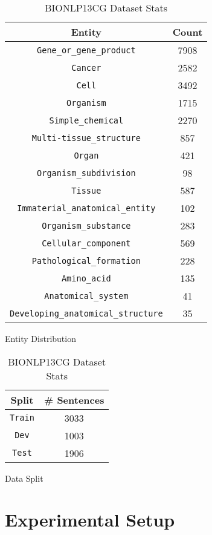 \begin{table}[h!]
\begin{subtable}[t]{.48\linewidth}
\centering
\begin{tabular}{|c|c|}\hline
	\textbf{Entity} & \textbf{Count}\\\hline
	\texttt{Gene\_or\_gene\_product} & 7908\\\hline
    \texttt{Cancer} & 2582\\\hline
    \texttt{Cell} & 3492\\\hline
    \texttt{Organism} & 1715\\\hline
    \texttt{Simple\_chemical} & 2270\\\hline
    \texttt{Multi-tissue\_structure} & 857\\\hline
    \texttt{Organ} & 421\\\hline
    \texttt{Organism\_subdivision} & 98\\\hline
    \texttt{Tissue} & 587\\\hline
    \texttt{Immaterial\_anatomical\_entity} & 102\\\hline
    \texttt{Organism\_substance} & 283\\\hline
    \texttt{Cellular\_component} & 569\\\hline
    \texttt{Pathological\_formation} & 228\\\hline
    \texttt{Amino\_acid} & 135\\\hline
    \texttt{Anatomical\_system} & 41\\\hline
    \texttt{Developing\_anatomical\_structure} & 35\\\hline
	\end{tabular}
	\caption{Entity Distribution}
	\label{tab:bio_entity_distribution}
\end{subtable}
\begin{subtable}[t]{.48\linewidth}
\centering
\begin{tabular}{|c|c|}\hline
	\textbf{Split} & \textbf{\# Sentences}\\\hline
	\texttt{Train} & 3033\\\hline
	\texttt{Dev} & 1003\\\hline
	\texttt{Test} & 1906\\\hline
	\end{tabular}
	\caption{Data Split}
	\label{tab:bio_dataset_split}
\end{subtable}
\caption{BIONLP13CG Dataset Stats}
\end{table}

\section{Experimental Setup}
